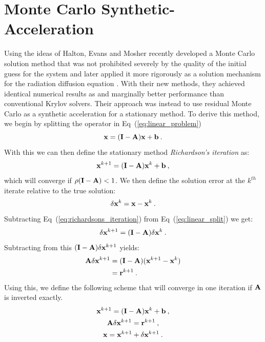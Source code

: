 \section{Monte Carlo Synthetic-Acceleration}
\label{sec:mcsa}
Using the ideas of Halton, Evans and Mosher recently developed a Monte
Carlo solution method that was not prohibited severely by the quality
of the initial guess for the system \citep{evans_monte_2009} and later
applied it more rigorously as a solution mechanism for the radiation
diffusion equation \citep{evans_monte_2012}. With their new methods,
they achieved identical numerical results as and marginally better
performance than conventional Krylov solvers. Their approach was
instead to use residual Monte Carlo as a synthetic acceleration for a
stationary method. To derive this method, we begin by splitting the
operator in Eq~(\ref{eq:linear_problem})
\begin{equation}
  \mathbf{x} = (\mathbf{I} - \mathbf{A})\mathbf{x} + \mathbf{b}\:.
  \label{eq:linear_split}
\end{equation}
With this we can then define the stationary method
\textit{Richardson's iteration} as:
\begin{equation}
  \mathbf{x}^{k+1} = (\mathbf{I} - \mathbf{A})\mathbf{x}^k + \mathbf{b}\:,
  \label{eq:richardsons_iteration}
\end{equation}
which will converge if $\rho(\mathbf{I} - \mathbf{A}) < 1$. We then define the
solution error at the $k^{th}$ iterate relative to the true solution:
\begin{equation}
  \delta \mathbf{x}^k = \mathbf{x} - \mathbf{x}^k\:.
  \label{eq:mcsa_error}
\end{equation}
Subtracting Eq~(\ref{eq:richardsons_iteration}) from
Eq~(\ref{eq:linear_split}) we get:
\begin{equation}
  \delta \mathbf{x}^{k+1} = (\mathbf{I} - \mathbf{A})\delta \mathbf{x}^k\:.
  \label{eq:mcsa_setup_1}
\end{equation}
Subtracting from this $(\mathbf{I} - \mathbf{A})\delta \mathbf{x}^{k+1}$ yields:
\begin{equation}
  \begin{split}
    \mathbf{A}\delta \mathbf{x}^{k+1} &= (\mathbf{I} -
    \mathbf{A})(\mathbf{x}^{k+1}-\mathbf{x}^{k}) \\ &= \mathbf{r}^{k+1}\:.
    \label{eq:mcsa_setup_2}
  \end{split}
\end{equation}
Using this, we define the following scheme that will converge in one
iteration if $\mathbf{A}$ is inverted exactly.
\begin{subequations}
  \begin{gather}
    \mathbf{x}^{k+1} = (\mathbf{I} - \mathbf{A})\mathbf{x}^k + \mathbf{b}\:,\\
    \mathbf{A} \delta \mathbf{x}^{k+1} = \mathbf{r}^{k+1}\:,\\
    \mathbf{x} = \mathbf{x}^{k+1} + \delta \mathbf{x}^{k+1}\:.
  \end{gather}
  \label{eq:mcsa_setup_3}
\end{subequations}
